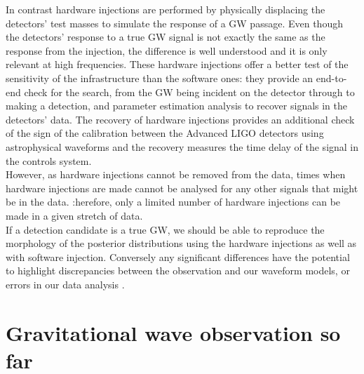 \documentclass[binding=0.6cm, LaM]{sapthesis}
\begin{document}
	In contrast hardware injections are performed by physically displacing
	the detectors’ test masses to simulate the response of a GW passage. 
	Even though the detectors’ response to a true GW signal is not 
	exactly the same as the response from the injection,
	the difference is well understood and it is only relevant at high frequencies.
	These hardware injections offer a better test of the sensitivity of the infrastructure than the software ones:
	they provide an end-to-end check for the search,
	from the GW being incident on 
	the detector through to making a detection, and parameter estimation analysis to recover signals in the detectors’ data. 
	The recovery of hardware injections provides an additional check 
	of the sign of the calibration between the Advanced LIGO detectors 
	using astrophysical waveforms and the recovery measures 
	the time delay of the signal in the controls system. \\ 
	However, as hardware injections cannot be removed from the data, 
	times when hardware injections are made cannot be analysed 
	for any other signals that might be in the data. 
	:herefore, only a limited number of hardware injections can be made in a given stretch of data. \\
	If a detection candidate is a true GW, 
	we should be able to reproduce the morphology of the posterior distributions 
	using the hardware injections as well as with software injection. 
	Conversely any significant differences have the potential to highlight 
	discrepancies between the observation and our waveform models, or errors in our data analysis \cite{50}. 
\chapter{Gravitational wave observation so far}
\end{document}
